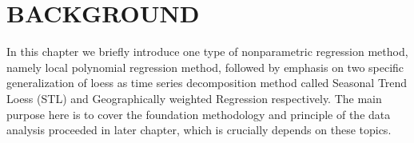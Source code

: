 \chapter{BACKGROUND}

In this chapter we briefly introduce one type of nonparametric regression method,
namely local polynomial regression method, followed by emphasis on two specific 
generalization of loess as time series decomposition method called Seasonal 
Trend Loess (STL) and Geographically weighted Regression respectively. The main
purpose here is to cover the foundation methodology and principle of the data
analysis proceeded in later chapter, which is crucially depends on these topics.  











